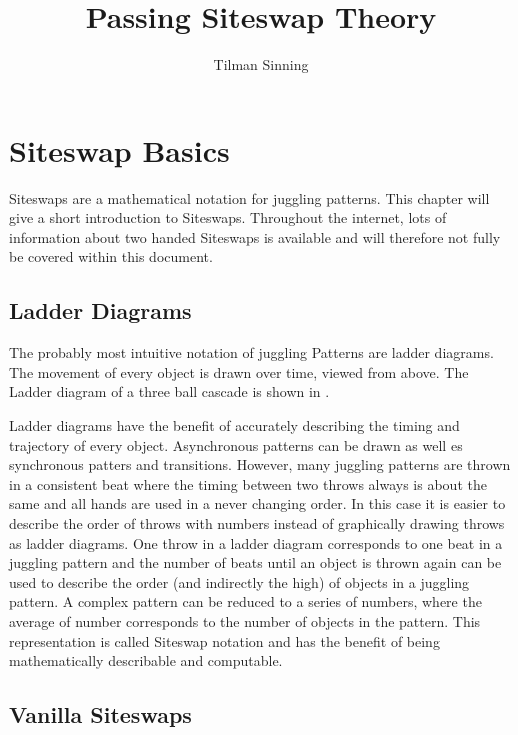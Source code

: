 \documentclass[a4paper,12pt,parskip=full]{scrreprt}
\title{Passing Siteswap Theory}
\author{Tilman Sinning}
\begin{document}
	\maketitle
	
	\tableofcontents
	
	
%	
	
	\chapter{Siteswap Basics}
	
	Siteswaps are a mathematical notation for juggling patterns. This chapter will give a short introduction to Siteswaps. Throughout the internet, lots of information about two handed Siteswaps is available and will therefore not fully be covered within this document.
	
	\section{Ladder Diagrams}
	
	The probably most intuitive notation of juggling Patterns are ladder diagrams. The movement of every object is drawn over time, viewed from above. The Ladder diagram of a three ball cascade is shown in .
	
	
	Ladder diagrams have the benefit of accurately describing the timing and trajectory of every object. Asynchronous patterns can be drawn as well es synchronous patters and transitions. However, many juggling patterns are thrown in a consistent beat where the timing between two throws always is about the same and all hands are used in a never changing order. In this case it is easier to describe the order of throws with numbers instead of graphically drawing throws as ladder diagrams. One throw in a ladder diagram corresponds to one beat in a juggling pattern and the number of beats until an object is thrown again can be used to describe the order (and indirectly the high) of objects in a juggling pattern. A complex pattern can be reduced to a series of numbers, where the average of number corresponds to the number of objects in the pattern. This representation is called Siteswap notation and has the benefit of being mathematically describable and computable.
	
	\section{Vanilla Siteswaps}
	
\end{document}
